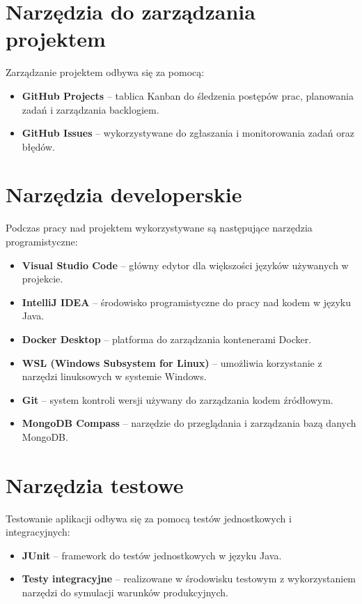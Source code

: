 \documentclass[12pt,a4paper]{book}
\begin{document}
\section{Narzędzia do zarządzania projektem}  
Zarządzanie projektem odbywa się za pomocą:  
\begin{itemize}  
    \item \textbf{GitHub Projects} – tablica Kanban do śledzenia postępów prac, planowania zadań i zarządzania backlogiem.  
    \item \textbf{GitHub Issues} – wykorzystywane do zgłaszania i monitorowania zadań oraz błędów.  
\end{itemize}

\section{Narzędzia developerskie}  
Podczas pracy nad projektem wykorzystywane są następujące narzędzia programistyczne:  
\begin{itemize}  
    \item \textbf{Visual Studio Code} – główny edytor dla większości języków używanych w projekcie.  
    \item \textbf{IntelliJ IDEA} – środowisko programistyczne do pracy nad kodem w języku Java.  
    \item \textbf{Docker Desktop} – platforma do zarządzania kontenerami Docker.  
    \item \textbf{WSL (Windows Subsystem for Linux)} – umożliwia korzystanie z narzędzi linuksowych w systemie Windows.  
    \item \textbf{Git} – system kontroli wersji używany do zarządzania kodem źródłowym.  
    \item \textbf{MongoDB Compass} – narzędzie do przeglądania i zarządzania bazą danych MongoDB.  
\end{itemize}  

\section{Narzędzia testowe}  
Testowanie aplikacji odbywa się za pomocą testów jednostkowych i integracyjnych:  
\begin{itemize}  
    \item \textbf{JUnit} – framework do testów jednostkowych w języku Java.  
    \item \textbf{Testy integracyjne} – realizowane w środowisku testowym z wykorzystaniem narzędzi do symulacji warunków produkcyjnych.  
\end{itemize}  
\end{document}
